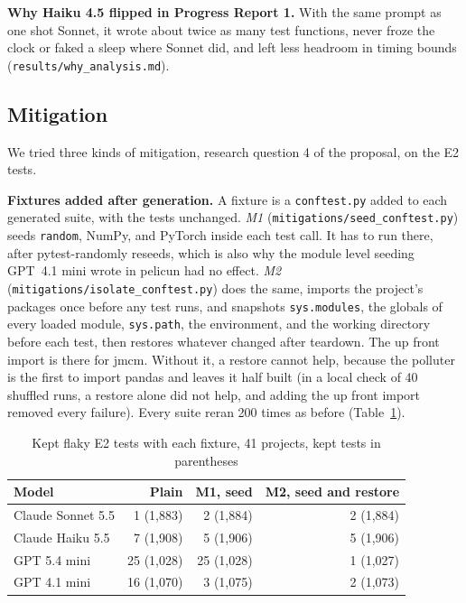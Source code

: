 \documentclass[sigconf,nonacm]{acmart}
\begin{document}
\textbf{Why Haiku 4.5 flipped in Progress Report 1.} With the same prompt as one shot Sonnet, it wrote about twice as many test functions, never froze the clock or faked a sleep where Sonnet did, and left less headroom in timing bounds (\texttt{results/why\_analysis.md}).

\subsection{Mitigation}
\label{sec:mitigation}
We tried three kinds of mitigation, research question 4 of the proposal, on the E2 tests.

\textbf{Fixtures added after generation.} A fixture is a \texttt{conftest.py} added to each generated suite, with the tests unchanged. \emph{M1} (\texttt{mitigations/seed\_conftest.py}) seeds \texttt{random}, NumPy, and PyTorch inside each test call. It has to run there, after pytest-randomly reseeds, which is also why the module level seeding GPT~4.1 mini wrote in pelicun had no effect. \emph{M2} (\texttt{mitigations/isolate\_conftest.py}) does the same, imports the project's packages once before any test runs, and snapshots \texttt{sys.modules}, the globals of every loaded module, \texttt{sys.path}, the environment, and the working directory before each test, then restores whatever changed after teardown. The up front import is there for jmcm. Without it, a restore cannot help, because the polluter is the first to import pandas and leaves it half built (in a local check of 40 shuffled runs, a restore alone did not help, and adding the up front import removed every failure). Every suite reran 200 times as before (Table~\ref{tab:mitig}).

\begin{table}[h]
\caption{Kept flaky E2 tests with each fixture, 41 projects, kept tests in parentheses}
\label{tab:mitig}
\small
\setlength{\tabcolsep}{3pt}
\begin{tabularx}{\columnwidth}{Xrrr}
\toprule
Model & Plain & M1, seed & M2, seed and restore \\
\midrule
Claude Sonnet 5.5 & 1 (1,883) & 2 (1,884) & 2 (1,884) \\
Claude Haiku 5.5 & 7 (1,908) & 5 (1,906) & 5 (1,906) \\
GPT 5.4 mini & 25 (1,028) & 25 (1,028) & 1 (1,027) \\
GPT 4.1 mini & 16 (1,070) & 3 (1,075) & 2 (1,073) \\
\bottomrule
\end{tabularx}
\end{table}
\end{document}
